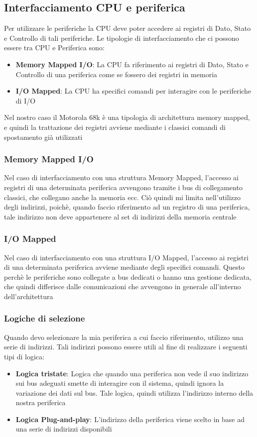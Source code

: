\subsection{Interfacciamento CPU e periferica}
Per utilizzare le periferiche la CPU deve poter accedere ai registri di Dato, Stato e Controllo di tali periferiche. Le tipologie di interfacciamento che ci possono essere tra CPU e Periferica sono:
\begin{itemize}
    \item \textbf{Memory Mapped I/O}: La CPU fa riferimento ai registri di Dato, Stato e Controllo di una periferica come se fossero dei registri in memoria
    \item \textbf{I/O Mapped}: La CPU ha specifici comandi per interagire con le periferiche di I/O
\end{itemize}

Nel nostro caso il Motorola 68k è una tipologia di architettura memory mapped, e quindi la trattazione dei registri avviene mediante i classici comandi di spostamento già utilizzati

\subsubsection{Memory Mapped I/O}
Nel caso di interfacciamento con una struttura Memory Mapped, l'accesso ai registri di una determinata periferica avvengono tramite i bus di collegamento classici, che collegano anche la memoria ecc. Ciò quindi mi limita nell'utilizzo degli indirizzi, poichè, quando faccio riferimento ad un registro di una periferica, tale indirizzo non deve appartenere al set di indirizzi della memoria centrale

\subsubsection{I/O Mapped}
Nel caso di interfacciamento con una struttura I/O Mapped, l'accesso ai registri di una determinata periferica avviene mediante degli specifici comandi. Questo perchè le periferiche sono collegate a bus dedicati o hanno una gestione dedicata, che quindi differisce dalle comunicazioni che avvengono in generale all'interno dell'architettura

\subsubsection{Logiche di selezione}
Quando devo selezionare la mia periferica a cui faccio riferimento, utilizzo una serie di indirizzi. Tali indirizzi possono essere utili al fine di realizzare i seguenti tipi di logica:
\begin{itemize}
    \item \textbf{Logica tristate}: Logica che quando una periferica non vede il suo indirizzo sui bus adeguati smette di interagire con il sistema, quindi ignora la variazione dei dati sul bus. Tale logica, quindi utilizza l'indirizzo interno della nostra periferica
    \item \textbf{Logica Plug-and-play}: L'indirizzo della periferica viene scelto in base ad una serie di indirizzi disponibili
\end{itemize}

